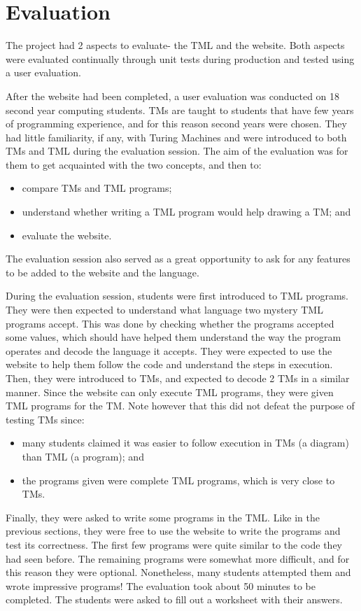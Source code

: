 \chapter{Evaluation} 
The project had 2 aspects to evaluate- the TML and the website. Both aspects were evaluated continually through unit tests during production and tested using a user evaluation.

After the website had been completed, a user evaluation was conducted on 18 second year computing students. TMs are taught to students that have few years of programming experience, and for this reason second years were chosen. They had little familiarity, if any, with Turing Machines and were introduced to both TMs and TML during the evaluation session. The aim of the evaluation was for them to get acquainted with the two concepts, and then to:
\begin{itemize}
    \item compare TMs and TML programs;
    \item understand whether writing a TML program would help drawing a TM; and
    \item evaluate the website.
\end{itemize}
The evaluation session also served as a great opportunity to ask for any features to be added to the website and the language.

During the evaluation session, students were first introduced to TML programs. They were then expected to understand what language two mystery TML programs accept. This was done by checking whether the programs accepted some values, which should have helped them understand the way the program operates and decode the language it accepts. They were expected to use the website to help them follow the code and understand the steps in execution. Then, they were introduced to TMs, and expected to decode 2 TMs in a similar manner. Since the website can only execute TML programs, they were given TML programs for the TM. Note however that this did not defeat the purpose of testing TMs since:
\begin{itemize}
    \item many students claimed it was easier to follow execution in TMs (a diagram) than TML (a program); and
    \item the programs given were complete TML programs, which is very close to TMs.
\end{itemize}
Finally, they were asked to write some programs in the TML. Like in the previous sections, they were free to use the website to write the programs and test its correctness. The first few programs were quite similar to the code they had seen before. The remaining programs were somewhat more difficult, and for this reason they were optional. Nonetheless, many students attempted them and wrote impressive programs! The evaluation took about 50 minutes to be completed. The students were asked to fill out a worksheet with their answers. 


